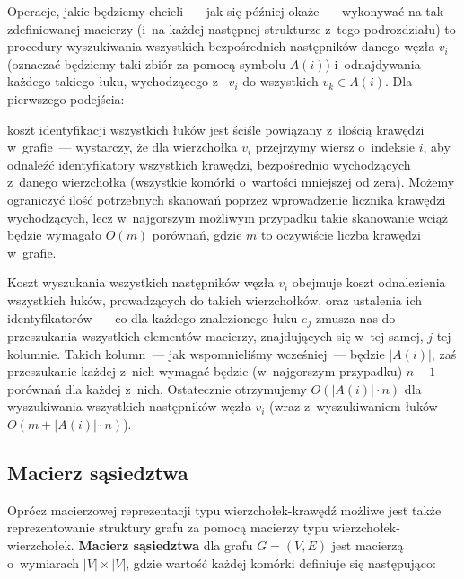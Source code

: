 Operacje, jakie będziemy chcieli~---  jak się później okaże~---  wykonywać na tak zdefiniowanej macierzy (i~na każdej następnej strukturze z~tego podrozdziału) to procedury wyszukiwania wszystkich bezpośrednich następników danego węzła $v_{i}$ (oznaczać będziemy taki zbiór za pomocą symbolu $A \left( i \right) $) i~odnajdywania każdego takiego łuku, wychodzącego z~ $v_{i}$ do wszystkich $v_{k} \in A \left( i \right) $.
Dla pierwszego podejścia:

\begin{myitemize}
	\item koszt identyfikacji wszystkich łuków jest ściśle powiązany z~ilością krawędzi w~grafie~---  wystarczy, że dla wierzchołka $v_{i}$ przejrzymy wiersz o~indeksie $i$, aby odnaleźć identyfikatory wszystkich krawędzi, bezpośrednio wychodzących z~danego wierzchołka (wszystkie komórki o~wartości mniejszej od zera). Możemy ograniczyć ilość potrzebnych skanowań poprzez wprowadzenie licznika krawędzi wychodzących, lecz w~najgorszym możliwym przypadku takie skanowanie wciąż będzie wymagało $O \left( m \right)$ porównań, gdzie $m$ to oczywiście liczba krawędzi w~grafie.
	\item Koszt wyszukania wszystkich następników węzła $v_{i}$ obejmuje koszt odnalezienia wszystkich łuków, prowadzących do takich wierzchołków, oraz ustalenia ich identyfikatorów~---  co dla każdego znalezionego łuku $e_{j}$ zmusza nas do przeszukania wszystkich elementów macierzy, znajdujących się w~tej samej, $j$-tej kolumnie. Takich kolumn~---  jak wspomnieliśmy wcześniej~---  będzie $ \left| A \left( i \right) \right| $, zaś przeszukanie każdej z~nich wymagać będzie (w~najgorszym przypadku) $n-1$ porównań dla każdej z~nich. Ostatecznie otrzymujemy $O \left( \left| A \left( i \right) \right| \cdot n \right)$ dla wyszukiwania wszystkich następników węzła $v_{i}$ (wraz z~wyszukiwaniem łuków~---  $O \left( m + \left| A \left( i \right) \right| \cdot n \right)$).
\end{myitemize}

\subsection{Macierz sąsiedztwa}

Oprócz macierzowej reprezentacji typu wierzchołek-krawędź możliwe jest także reprezentowanie struktury grafu za pomocą macierzy typu wierzchołek-wierzchołek. \textbf{Macierz sąsiedztwa} dla grafu $G = \left( V, E \right) $ jest macierzą o~wymiarach $\left| V \right| \times \left| V \right|$, gdzie wartość każdej komórki definiuje się następująco:

